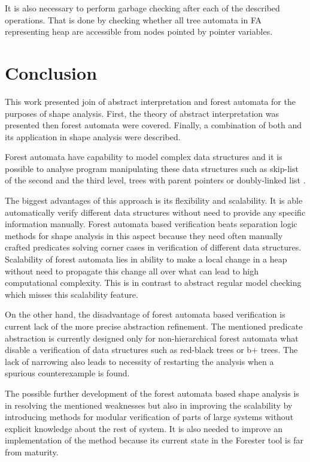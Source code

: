 \documentclass[a4paper, 12pt]{article}
\begin{document}
It is also necessary to perform garbage checking after each of the described operations.
That is done by checking whether all tree automata in FA representing heap are accessible
from nodes pointed by pointer variables.

\section{Conclusion}

This work presented join of abstract interpretation and forest automata
for the purposes of shape analysis.
First, the theory of abstract interpretation was presented
then forest automata were covered.
Finally, a combination of both and its application
in shape analysis were described.

Forest automata have capability to model complex data structures
and it is possible to analyse program manipulating these data structures
such as skip-list of the second and the third level, trees with parent pointers
or doubly-linked list \cite{svcomp15}.

The biggest advantages of this approach is its flexibility and scalability.
It is able automatically verify different data structures without need to
provide any specific information manually.
Forest automata based verification beats separation logic methods for shape analysis
in this aspect because they need often manually crafted predicates
solving corner cases in verification of different data structures.
Scalability of forest automata lies in ability to make a local
change in a heap without need to propagate this change all over
what can lead to high computational complexity.
This is in contrast to abstract regular model checking which
misses this scalability feature.

On the other hand, the disadvantage of forest automata based verification
is current lack of the more precise abstraction refinement.
The mentioned predicate abstraction is currently designed only for
non-hierarchical forest automata what disable a verification of
data structures such as red-black trees or b+ trees.
The lack of narrowing also leads to necessity of restarting
the analysis when a spurious counterexample is found.

The possible further development of the forest automata based shape analysis
is in resolving the mentioned weaknesses but also in improving
the scalability by introducing methods for modular verification
of parts of large systems without explicit knowledge about the rest of system.
It is also needed to improve an implementation of the method because
its current state in the Forester tool is far from maturity.

\newpage


\end{document}
